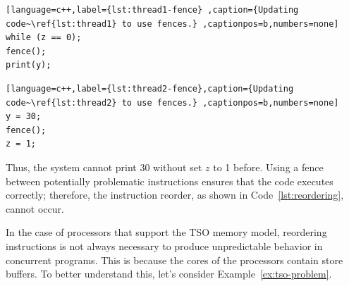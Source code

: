 \begin{example}
\begin{lstlisting}[language=c++,label={lst:thread1-fence} ,caption={Updating code~\ref{lst:thread1} to use fences.} ,captionpos=b,numbers=none]
while (z == 0);
fence();
print(y);
\end{lstlisting}

\begin{lstlisting}[language=c++,label={lst:thread2-fence},caption={Updating code~\ref{lst:thread2} to use fences.} ,captionpos=b,numbers=none]
y = 30;
fence();
z = 1;
\end{lstlisting}

Thus, the system cannot print 30 without set \(z\) to 1 before. Using a fence between potentially problematic instructions ensures that the code executes correctly; therefore, the instruction reorder, as shown in Code~\ref{lst:reordering}, cannot occur.
\end{example}


In the case of processors that support the TSO memory model, reordering instructions is not always necessary to produce unpredictable behavior in concurrent programs. This is because the cores of the processors contain store buffers. To better understand this, let's consider Example~\ref{ex:tso-problem}.

